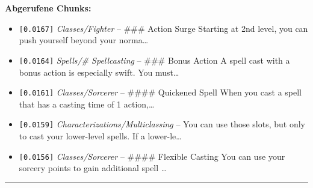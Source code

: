 \noindent\textbf{Abgerufene Chunks:}
\begin{itemize}[noitemsep, topsep=2pt]
  \item[\textbf{\#1}] \texttt{[0.0167]} \textit{Classes/Fighter} -- \#\#\# Action Surge  Starting at 2nd level, you can push yourself beyond your norma\ldots
  \item[\textbf{\#2}] \texttt{[0.0164]} \textit{Spells/# Spellcasting} -- \#\#\# Bonus Action  A spell cast with a bonus action is especially swift. You must\ldots
  \item[\textbf{\#3}] \texttt{[0.0161]} \textit{Classes/Sorcerer} -- \#\#\#\# Quickened Spell  When you cast a spell that has a casting time of 1 action,\ldots
  \item[\textbf{\#4}] \texttt{[0.0159]} \textit{Characterizations/Multiclassing} -- You can use those slots, but only to cast your lower-level spells. If a lower-le\ldots
  \item[\textbf{\#5}] \texttt{[0.0156]} \textit{Classes/Sorcerer} -- \#\#\#\# Flexible Casting  You can use your sorcery points to gain additional spell \ldots
\end{itemize}
\vspace{4pt}
\hrule
\vspace{6pt}
